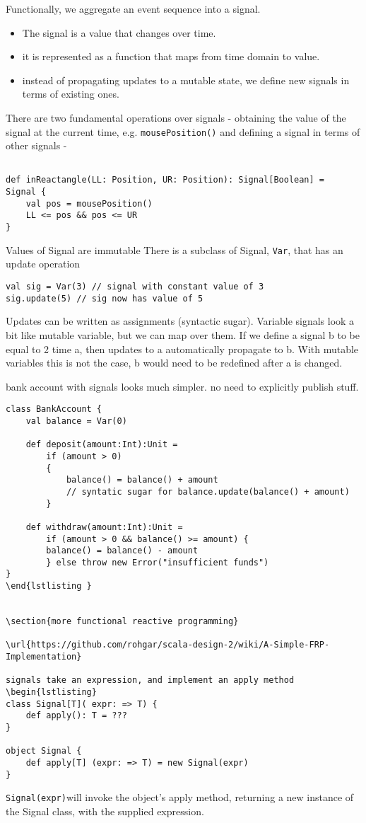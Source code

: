 Functionally, we aggregate an event sequence into a signal.
\begin{itemize}
	\item The signal is a value that changes over time.
	\item it is represented as a function that maps from time domain to value.
	\item instead of propagating updates to a mutable state, we define new signals in terms of existing ones.
\end{itemize}

There are two fundamental operations over signals - obtaining the value of the signal at the current time, e.g. \lstinline|mousePosition()| and defining a signal in terms of other signals -
\begin{lstlisting}

def inReactangle(LL: Position, UR: Position): Signal[Boolean] = 
Signal {
	val pos = mousePosition()
	LL <= pos && pos <= UR
}
\end{lstlisting}

Values of Signal are immutable
There is a subclass of Signal, \lstinline|Var|, that has an update operation
\begin{lstlisting}
val sig = Var(3) // signal with constant value of 3
sig.update(5) // sig now has value of 5
\end{lstlisting}

Updates can be written as assignments (syntactic sugar).
Variable signals look a bit like mutable variable, but we can map over them. If we define a signal b to be equal to 2 time a, then updates to a automatically propagate to b. With mutable variables this is not the case, b would need to be redefined after a is changed.

bank account with signals looks much simpler. no need to explicitly publish stuff.
\begin{lstlisting}
class BankAccount {
	val balance = Var(0)
	
	def deposit(amount:Int):Unit = 
		if (amount > 0) 
		{
			balance() = balance() + amount
			// syntatic sugar for balance.update(balance() + amount)
		}

	def withdraw(amount:Int):Unit = 
		if (amount > 0 && balance() >= amount) {
		balance() = balance() - amount
		} else throw new Error("insufficient funds")
}
\end{lstlisting }


\section{more functional reactive programming}

\url{https://github.com/rohgar/scala-design-2/wiki/A-Simple-FRP-Implementation}

signals take an expression, and implement an apply method
\begin{lstlisting}
class Signal[T]( expr: => T) {
    def apply(): T = ??? 
}

object Signal {
    def apply[T] (expr: => T) = new Signal(expr)
}
\end{lstlisting}
\lstinline|Signal(expr)|will invoke the object's apply method, returning a new instance of the Signal class, with the supplied expression.

